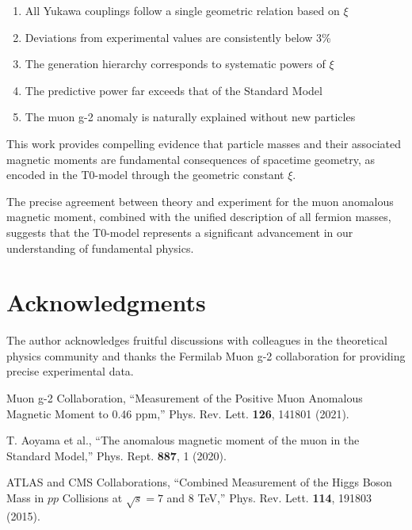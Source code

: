 \documentclass[12pt,a4paper]{article}
\newcommand{\xipar}{\xi}
\begin{document}
	\begin{enumerate}
		\item All Yukawa couplings follow a single geometric relation based on $\xipar$
		\item Deviations from experimental values are consistently below 3\%
		\item The generation hierarchy corresponds to systematic powers of $\xipar$
		\item The predictive power far exceeds that of the Standard Model
		\item The muon g-2 anomaly is naturally explained without new particles
	\end{enumerate}
	
	\begin{tcolorbox}[colback=green!5!white,colframe=green!75!black,title=Fundamental Conclusion]
		This work provides compelling evidence that particle masses and their associated magnetic moments are fundamental consequences of spacetime geometry, as encoded in the T0-model through the geometric constant $\xipar$.
	\end{tcolorbox}
	
	The precise agreement between theory and experiment for the muon anomalous magnetic moment, combined with the unified description of all fermion masses, suggests that the T0-model represents a significant advancement in our understanding of fundamental physics.
	
	\section{Acknowledgments}
	
	The author acknowledges fruitful discussions with colleagues in the theoretical physics community and thanks the Fermilab Muon g-2 collaboration for providing precise experimental data.
	
	\begin{thebibliography}{99}
		
		Muon g-2 Collaboration, ``Measurement of the Positive Muon Anomalous Magnetic Moment to 0.46 ppm,'' Phys. Rev. Lett. \textbf{126}, 141801 (2021).
		
		T. Aoyama et al., ``The anomalous magnetic moment of the muon in the Standard Model,'' Phys. Rept. \textbf{887}, 1 (2020).
		
		ATLAS and CMS Collaborations, ``Combined Measurement of the Higgs Boson Mass in $pp$ Collisions at $\sqrt{s} = 7$ and 8 TeV,'' Phys. Rev. Lett. \textbf{114}, 191803 (2015).
		
	\end{thebibliography}
	
\end{document}
